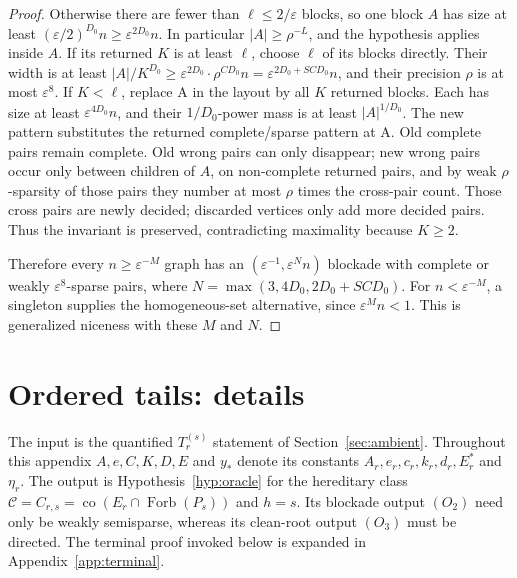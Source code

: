 \documentclass[11pt,a4paper]{article}
\theoremstyle{definition}
\theoremstyle{remark}
\numberwithin{equation}{section}
\DeclareMathOperator{\Forb}{Forb}
\DeclareMathOperator{\co}{co}
\begin{document}
\begin{proof}
Otherwise there are fewer than \(\ell\le\allowbreak 2/\varepsilon\) blocks, so one block \(A\) has size at least \((\varepsilon/2)^{D_{0}} n\ge\allowbreak \varepsilon^{2D_{0}}n\). In particular \(|A|\ge\allowbreak \rho^{-L}\), and the hypothesis applies inside \(A\). If its returned \(K\) is at least \(\ell\), choose \(\ell\) of its blocks directly. Their width is at least \(|A|/K^{D_{0}} \ge\allowbreak \varepsilon^{2D_{0}}\cdot \rho^{C D_{0}}n =\varepsilon^{2D_{0}+S C D_{0}}n\), and their precision \(\rho\) is at most \(\varepsilon^{8}\). If \(K<\ell\), replace A in the layout by all \(K\) returned blocks. Each has size at least \(\varepsilon^{4D_{0}}n\), and their \(1/D_{0}\)-power mass is at least \(|A|^{1/D_{0}}\). The new pattern substitutes the returned complete/sparse pattern at A. Old complete pairs remain complete. Old wrong pairs can only disappear; new wrong pairs occur only between children of \(A\), on non-complete returned pairs, and by weak \(\rho\)-sparsity of those pairs they number at most \(\rho\) times the cross-pair count. Those cross pairs are newly decided; discarded vertices only add more decided pairs. Thus the invariant is preserved, contradicting maximality because \(K\ge\allowbreak 2\).

Therefore every \(n\ge\allowbreak \varepsilon^{-M}\) graph has an \((\varepsilon^{-1},\allowbreak \varepsilon^{N} n)\) blockade with complete or weakly \(\varepsilon^{8}\)-sparse pairs, where \(N=\max (3,\allowbreak 4D_{0},\allowbreak 2D_{0}+S C D_{0})\). For \(n<\varepsilon^{-M}\), a singleton supplies the homogeneous-set alternative, since \(\varepsilon^{M}n<1\). This is generalized niceness with these \(M\) and \(N\).
\end{proof}

\section{Ordered tails: details}\label{app:tail}

The input is the quantified \(T_r^{(s)}\) statement of Section~\ref{sec:ambient}. Throughout this appendix \(A,e,C,K,D,E\) and \(y_{*}\) denote its constants \(A_{r},e_{r},c_{r},k_{r},d_{r},E_{r}^{*}\) and \(\eta_{r}\). The output is Hypothesis~\ref{hyp:oracle} for the hereditary class \(\mathcal C=C_{r,s}=\co(E_r\cap\Forb(P_s))\) and \(h=s\). Its blockade output \((O_{2})\) need only be weakly semisparse, whereas its clean-root output \((O_{3})\) must be directed. The terminal proof invoked below is expanded in Appendix~\ref{app:terminal}.
\end{document}
